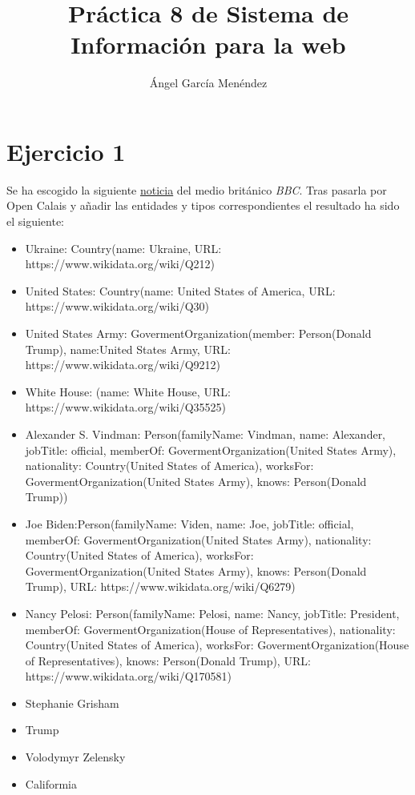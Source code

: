 \documentclass{report}
\begin{document}
\title{Práctica 8 de Sistema de Información para la web}
\author{Ángel García Menéndez}

\maketitle

\section{Ejercicio 1}

Se ha escogido la siguiente \href{https://www.bbc.com/news/world-us-canada-50214895}{noticia} del medio británico \textit{BBC}.
Tras pasarla por Open Calais y añadir las entidades y tipos correspondientes el resultado ha sido el siguiente:

\begin{itemize}
\item Ukraine: Country(name: Ukraine, URL: https://www.wikidata.org/wiki/Q212)
\item United States: Country(name: United States of America, URL: https://www.wikidata.org/wiki/Q30)
\item United States Army: GovermentOrganization(member: Person(Donald Trump), name:United States Army, URL: https://www.wikidata.org/wiki/Q9212)
\item White House: (name: White House, URL: https://www.wikidata.org/wiki/Q35525)
\item Alexander S. Vindman: Person(familyName: Vindman, name: Alexander, jobTitle: official, memberOf: GovermentOrganization(United States Army), nationality: Country(United States of America), worksFor: GovermentOrganization(United States Army), knows: Person(Donald Trump))
\item Joe Biden:Person(familyName: Viden, name: Joe, jobTitle: official, memberOf: GovermentOrganization(United States Army), nationality: Country(United States of America), worksFor: GovermentOrganization(United States Army), knows: Person(Donald Trump), URL: https://www.wikidata.org/wiki/Q6279)
\item Nancy Pelosi: Person(familyName: Pelosi, name: Nancy, jobTitle: President, memberOf: GovermentOrganization(House of Representatives), nationality: Country(United States of America), worksFor: GovermentOrganization(House of Representatives), knows: Person(Donald Trump), URL: https://www.wikidata.org/wiki/Q170581)
\item Stephanie Grisham
\item Trump
\item Volodymyr Zelensky
\item Califormia
\end{itemize}
\end{document}
